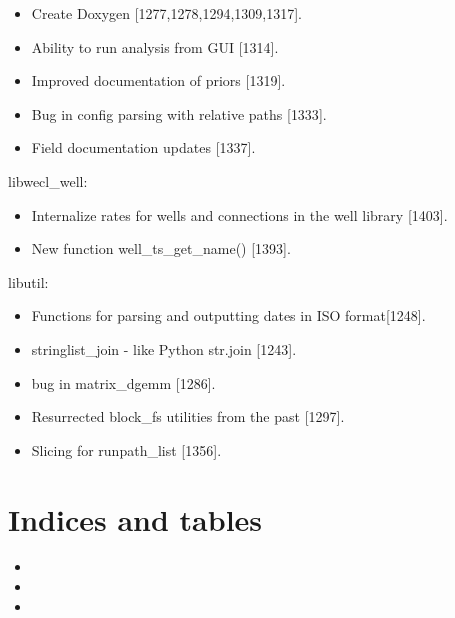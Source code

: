 \documentclass[letterpaper,10pt,english]{sphinxmanual}
\begin{document}
\begin{itemize}
\item {} 
Create Doxygen {[}1277,1278,1294,1309,1317{]}.

\item {} 
Ability to run analysis from GUI {[}1314{]}.

\item {} 
Improved documentation of priors {[}1319{]}.

\item {} 
Bug in config parsing with relative paths {[}1333{]}.

\item {} 
Field documentation updates {[}1337{]}.

\end{itemize}

libwecl\_well:
\begin{itemize}
\item {} 
Internalize rates for wells and connections in the well library
{[}1403{]}.

\item {} 
New function well\_ts\_get\_name() {[}1393{]}.

\end{itemize}

libutil:
\begin{itemize}
\item {} 
Functions for parsing and outputting dates in ISO format{[}1248{]}.

\item {} 
stringlist\_join - like Python str.join {[}1243{]}.

\item {} 
bug in matrix\_dgemm {[}1286{]}.

\item {} 
Resurrected block\_fs utilities from the past {[}1297{]}.

\item {} 
Slicing for runpath\_list {[}1356{]}.

\end{itemize}


\chapter{Indices and tables}
\label{\detokenize{manual:indices-and-tables}}\begin{itemize}
\item {} 

\item {} 

\item {} 

\end{itemize}



\renewcommand{\indexname}{Index}
\printindex
\end{document}
